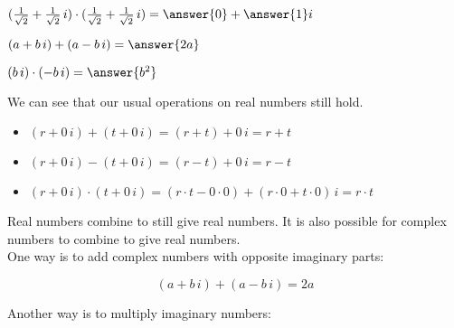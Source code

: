 \documentclass{ximera}
\begin{document}
\begin{question}


\item   $(\frac{1}{\sqrt{2}} +  \frac{1}{\sqrt{2}} \, i) \cdot (\frac{1}{\sqrt{2}} + \frac{1}{\sqrt{2}} \, i) = \answer{0} + \answer{1} i$


\end{question}










\begin{question}


\item   $(a +  b \, i) + (a - b \, i) = \answer{2a}$


\end{question}






\begin{question}


\item   $(b \, i) \cdot  (-b \, i) = \answer{b^2}$


\end{question}






We can see that our usual operations on real numbers still hold.

\begin{itemize}
\item $(r + 0 \, i) + (t + 0 \, i) = (r + t) + 0 \, i = r + t$ \\ 
\item $(r + 0 \, i) - (t + 0 \, i) = (r - t) + 0 \, i = r - t$ \\ 
\item $(r + 0 \, i) \cdot (t + 0 \, i) = (r \cdot t - 0 \cdot 0) + (r \cdot 0 + t \cdot 0) \, i = r \cdot t$ \\ 
\end{itemize}


Real numbers combine to still give real numbers.  It is also possible for complex numbers to combine to give real numbers. \\


One way is to add complex numbers with opposite imaginary parts:

\[
(a + b \, i) + (a - b \, i) = 2a
\]



Another way is to multiply imaginary numbers:
\end{document}
